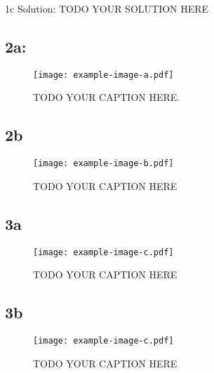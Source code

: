 \documentclass[10pt]{article}
\begin{document}
1c Solution:
TODO YOUR SOLUTION HERE
\newpage 

\subsection{2a: }
\renewcommand{\figurename}{Fig.}
\renewcommand{\thefigure}{2a}
 \begin{figure}[!h]
     \centering
     \texttt{[image: example-image-a.pdf]}
     \label{fig:2a}
\caption{TODO YOUR CAPTION HERE. 
}%
 \end{figure}

\newpage 

\subsection{2b}
\renewcommand{\thefigure}{2b}
 \begin{figure}[!h]
     \centering
     \texttt{[image: example-image-b.pdf]}
     \label{fig:2b}
\caption{
TODO YOUR CAPTION HERE
}%
 \end{figure}

\newpage 

\subsection{3a}
\renewcommand{\thefigure}{3a}
 \begin{figure}[!h]
     \centering
     \texttt{[image: example-image-c.pdf]}
     \label{fig:3a}
     \caption{
TODO YOUR CAPTION HERE
}%
 \end{figure}

\newpage 

\subsection{3b}
\renewcommand{\thefigure}{3b}
 \begin{figure}[!h]
     \centering
     \texttt{[image: example-image-c.pdf]}
     \label{fig:3b}
\caption{
TODO YOUR CAPTION HERE
}%
 \end{figure}
 
\end{document}

